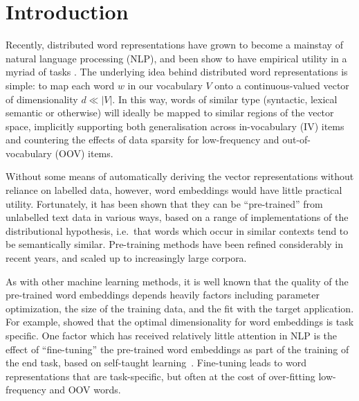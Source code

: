 \section{Introduction}

Recently, distributed word representations have grown to become a
mainstay of natural language processing (NLP), and been show to have
empirical utility in a myriad of tasks
\cite{Collobert2008,turian2010word,baroni:2014,Andreas:Klein:2014}.  The
underlying idea behind distributed word representations is simple: to
map each word $w$ in our vocabulary $V$ onto a continuous-valued vector
of dimensionality $d \ll |V|$.  In this way, words of similar type
(syntactic, lexical semantic or otherwise) will ideally be mapped to
similar regions of the vector space, implicitly supporting both
generalisation across in-vocabulary (IV) items and countering the
effects of data sparsity for low-frequency and out-of-vocabulary (OOV)
items.

Without some means of automatically deriving the vector representations
without reliance on labelled data, however, word embeddings would have
little practical utility. Fortunately, it has been shown that they can
be ``pre-trained'' from unlabelled text data in various ways, based on a
range of implementations of the distributional hypothesis, i.e.\ that
words which occur in similar contexts tend to be semantically
similar. Pre-training methods have been refined considerably in recent
years, and scaled up to increasingly large corpora.

As with other machine learning methods, it is well known that the
quality of the pre-trained word embeddings depends heavily factors
including parameter optimization, the size of the training data, and the
fit with the target application. For example, 
showed that the optimal dimensionality for word embeddings is task
specific.  One factor which has received relatively little attention in
NLP is the effect of ``fine-tuning'' the pre-trained word embeddings as
part of the training of the end task, based on self-taught
learning~\cite{raina2007self}.  Fine-tuning leads to word
representations that are task-specific, but often at the cost of
over-fitting low-frequency and OOV words.


